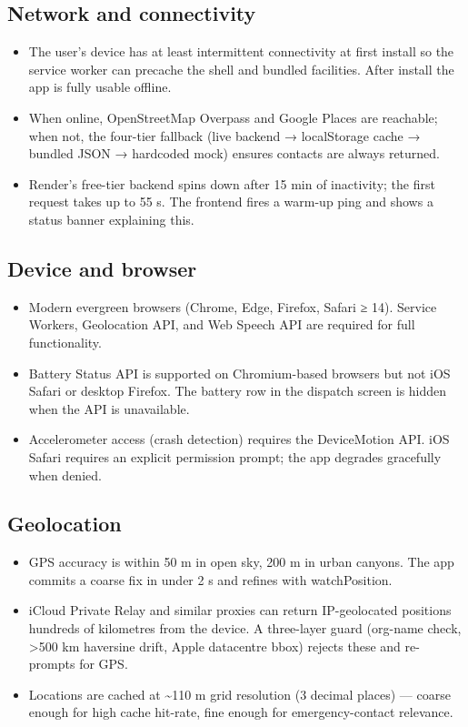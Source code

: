 \documentclass[11pt, a4paper]{article}
\begin{document}
\subsection{Network and connectivity}
\begin{itemize}
  \item The user's device has at least intermittent connectivity at first install so the service worker can precache the shell and bundled facilities. After install the app is fully usable offline.
  \item When online, OpenStreetMap Overpass and Google Places are reachable; when not, the four-tier fallback (live backend → localStorage cache → bundled JSON → hardcoded mock) ensures contacts are always returned.
  \item Render's free-tier backend spins down after 15 min of inactivity; the first request takes up to 55 s. The frontend fires a warm-up ping and shows a status banner explaining this.
\end{itemize}

\subsection{Device and browser}
\begin{itemize}
  \item Modern evergreen browsers (Chrome, Edge, Firefox, Safari ≥ 14). Service Workers, Geolocation API, and Web Speech API are required for full functionality.
  \item Battery Status API is supported on Chromium-based browsers but not iOS Safari or desktop Firefox. The battery row in the dispatch screen is hidden when the API is unavailable.
  \item Accelerometer access (crash detection) requires the DeviceMotion API. iOS Safari requires an explicit permission prompt; the app degrades gracefully when denied.
\end{itemize}

\subsection{Geolocation}
\begin{itemize}
  \item GPS accuracy is within 50 m in open sky, 200 m in urban canyons. The app commits a coarse fix in under 2 s and refines with watchPosition.
  \item iCloud Private Relay and similar proxies can return IP-geolocated positions hundreds of kilometres from the device. A three-layer guard (org-name check, >500 km haversine drift, Apple datacentre bbox) rejects these and re-prompts for GPS.
  \item Locations are cached at \textasciitilde{}110 m grid resolution (3 decimal places) — coarse enough for high cache hit-rate, fine enough for emergency-contact relevance.
\end{itemize}
\end{document}
